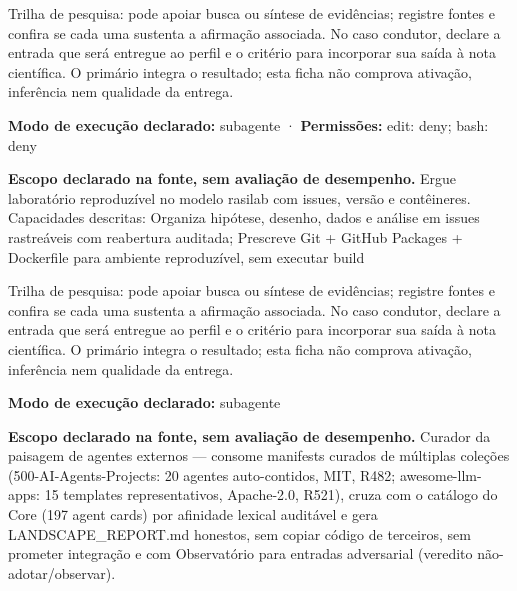 \begin{funcao}
Trilha de pesquisa: pode apoiar busca ou síntese de evidências; registre fontes e confira se cada uma sustenta a afirmação associada. No caso condutor, declare a entrada que será entregue ao perfil e o critério para incorporar sua saída à nota científica. O primário integra o resultado; esta ficha não comprova ativação, inferência nem qualidade da entrega.
\end{funcao}

\begin{arquitetura}
\textbf{Modo de execução declarado:} subagente · \textbf{Permissões:} edit: deny; bash: deny
\end{arquitetura}


\begin{descricao}
\textbf{Escopo declarado na fonte, sem avaliação de desempenho.}
Ergue laboratório reproduzível no modelo rasilab com issues, versão e contêineres. Capacidades descritas: Organiza hipótese, desenho, dados e análise em issues rastreáveis com reabertura auditada; Prescreve Git + GitHub Packages + Dockerfile para ambiente reproduzível, sem executar build
\end{descricao}

\begin{funcao}
Trilha de pesquisa: pode apoiar busca ou síntese de evidências; registre fontes e confira se cada uma sustenta a afirmação associada. No caso condutor, declare a entrada que será entregue ao perfil e o critério para incorporar sua saída à nota científica. O primário integra o resultado; esta ficha não comprova ativação, inferência nem qualidade da entrega.
\end{funcao}

\begin{arquitetura}
\textbf{Modo de execução declarado:} subagente
\end{arquitetura}


\begin{descricao}
\textbf{Escopo declarado na fonte, sem avaliação de desempenho.}
Curador da paisagem de agentes externos — consome manifests curados de múltiplas coleções (500-AI-Agents-Projects: 20 agentes auto-contidos, MIT, R482; awesome-llm-apps: 15 templates representativos, Apache-2.0, R521), cruza com o catálogo do Core (197 agent cards) por afinidade lexical auditável e gera LANDSCAPE\_REPORT.md honestos, sem copiar código de terceiros, sem prometer integração e com Observatório para entradas adversarial (veredito não-adotar/observar).
\end{descricao}

